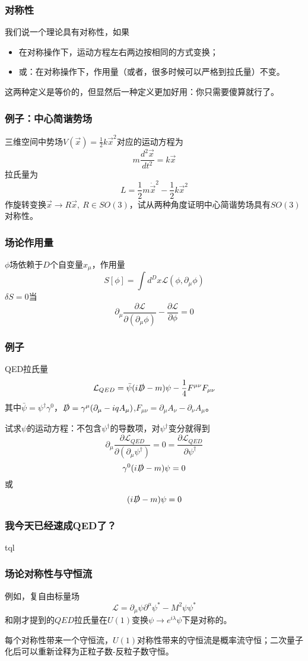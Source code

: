 \documentclass[CJK]{beamer}
\begin{document}
\begin{frame}
\frametitle{\bch 对称性 \ech}
\bch
我们说一个理论具有对称性，如果
\begin{itemize}
\item 在对称操作下，运动方程左右两边按相同的方式变换；
\item 或：在对称操作下，作用量（或者，很多时候可以严格到拉氏量）不变。
\end{itemize}
这两种定义是等价的，但显然后一种定义更加好用：你只需要傻算就行了。
\ech
\end{frame}

\begin{frame}
\frametitle{\bch 例子：中心简谐势场 \ech}
\bch
三维空间中势场$V(\vec x ) = \frac{1}{2}k \vec x^2$对应的运动方程为
$$
m \frac{d^2 \vec x}{dt^2} = k \vec x
$$
拉氏量为
$$
L = \frac{1}{2} m \dot{\vec x}^2 - \frac{1}{2}k \vec x^2
$$
作旋转变换$\vec x \to R \vec x,\ R \in SO(3)$，试从两种角度证明中心简谐势场具有$SO(3)$对称性。
\ech
\end{frame}

\begin{frame}
\frametitle{\bch 场论作用量 \ech}
\bch
$\phi$场依赖于$D$个自变量$x_\mu$，作用量
$$S[\phi] = \int d^D x \mathcal{L} (\phi,\partial_\mu \phi)$$
$\delta S = 0$当$$\partial_\mu \frac{\partial \mathcal{L}}{\partial (\partial_\mu \phi)} - \frac{\partial \mathcal{L}}{\partial \phi} = 0$$

\ech
\end{frame}

\begin{frame}
\frametitle{\bch 例子 \ech}
\bch
QED拉氏量
$$
\mathcal{L}_{QED} = \bar{\psi} ( i \slashed{D} - m) \psi - \frac{1}{4} F^{\mu \nu} F_{\mu \nu}$$
其中$\bar{\psi} = \psi^\dagger \gamma^0$，$\slashed D = \gamma^\mu ( \partial_\mu - iq A_\mu)$,$F_{\mu \nu} = \partial_\mu A_\nu - \partial_\nu A_\mu$。
\par
试求$\psi$的运动方程：不包含$\psi^\dagger$的导数项，对$\psi^\dagger$变分就得到
$$
\partial_\mu \frac{\partial \mathcal{L}_{QED} }{\partial (\partial_\mu \psi^\dagger)} = 0 = \frac{\partial \mathcal{L}_{QED}}{\partial \psi^\dagger}$$
$$
\gamma^0 (i \slashed{D} - m) \psi = 0
$$
或
$$
(i\slashed{D} - m) \psi =0
$$

\ech
\end{frame}

\begin{frame}
\frametitle{\bch 我今天已经速成QED了？ \ech}
\bch
{\Huge \centering tql}
\ech
\end{frame}

\begin{frame}
\frametitle{\bch 场论对称性与守恒流 \ech}
\bch
例如，复自由标量场
$$
\mathcal{L} = \partial_\mu \psi \partial^\mu \psi^* - M^2 \psi \psi^*
$$
和刚才提到的$QED$拉氏量在$U(1)$变换$\psi \to e^{i\lambda} \psi$下是对称的。
\par
每个对称性带来一个守恒流，$U(1)$对称性带来的守恒流是概率流守恒；二次量子化后可以重新诠释为正粒子数-反粒子数守恒。
\ech
\end{frame}
\end{document}
